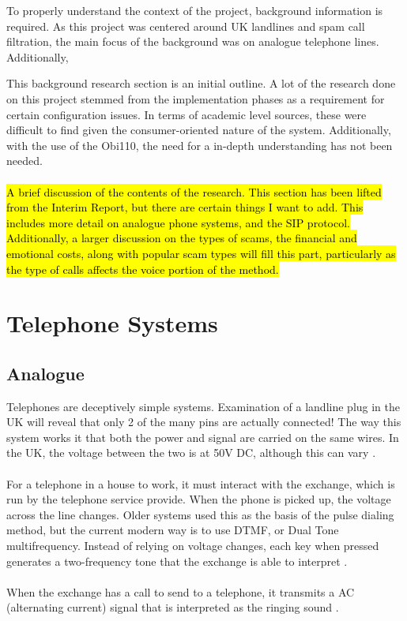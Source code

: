 \documentclass[main.tex]{subfiles}
\begin{document}
To properly understand the context of the project, background information is required. As this project was centered around UK landlines and spam call filtration, the main focus of the background was on analogue telephone lines. Additionally, 

This background research section is an initial outline. A lot of the research done on this project stemmed from the implementation phases as a requirement for certain configuration issues. In terms of academic level sources, these were difficult to find given the consumer-oriented nature of the system. Additionally, with the use of the Obi110, the need for a in-depth understanding has not been needed.
\\\\
\hl{A brief discussion of the contents of the research. This section has been lifted from the Interim Report, but there are certain things I want to add. This includes more detail on analogue phone systems, and the SIP protocol. Additionally, a larger discussion on the types of scams, the financial and emotional costs, along with popular scam types will fill this part, particularly as the type of calls affects the voice portion of the method.}

\section{Telephone Systems}
\subsection{Analogue}
Telephones are deceptively simple systems. Examination of a landline plug in the UK will reveal that only 2 of the many pins are actually connected! The way this system works it that both the power and signal are carried on the same wires. In the UK, the voltage between the two is at 50V DC, although this can vary \cite{telephone}.
\\\\
For a telephone in a house to work, it must interact with the exchange, which is run by the telephone service provide. When the phone is picked up, the voltage across the line changes. Older systems used this as the basis of the pulse dialing method, but the current modern way is to use DTMF, or Dual Tone multifrequency. Instead of relying on voltage changes, each key when pressed generates a two-frequency tone that the exchange is able to interpret \cite{telephone}.
\\\\
When the exchange has a call to send to a telephone, it transmits a AC (alternating current) signal that is interpreted as the ringing sound \cite{telephone}.
\end{document}
